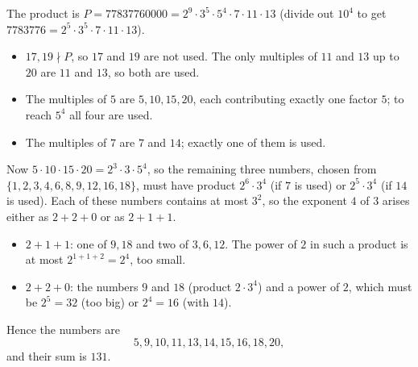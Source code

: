 The product is $P=77837760000=2^9\cdot3^5\cdot5^4\cdot7\cdot11\cdot13$ (divide out $10^4$ to get $7783776=2^5\cdot3^5\cdot7\cdot11\cdot13$).
\begin{itemize}
\item $17,19\nmid P$, so $17$ and $19$ are not used. The only multiples of $11$ and $13$ up to $20$ are $11$ and $13$, so both are used.
\item The multiples of $5$ are $5,10,15,20$, each contributing exactly one factor $5$; to reach $5^4$ all four are used.
\item The multiples of $7$ are $7$ and $14$; exactly one of them is used.
\end{itemize}
Now $5\cdot10\cdot15\cdot20=2^3\cdot3\cdot5^4$, so the remaining three numbers, chosen from $\{1,2,3,4,6,8,9,12,16,18\}$, must have product $2^6\cdot3^4$ (if $7$ is used) or $2^5\cdot3^4$ (if $14$ is used). Each of these numbers contains at most $3^2$, so the exponent $4$ of $3$ arises either as $2+2+0$ or as $2+1+1$.
\begin{itemize}
\item $2+1+1$: one of $9,18$ and two of $3,6,12$. The power of $2$ in such a product is at most $2^{1+1+2}=2^4$, too small.
\item $2+2+0$: the numbers $9$ and $18$ (product $2\cdot3^4$) and a power of $2$, which must be $2^5=32$ (too big) or $2^4=16$ (with $14$).
\end{itemize}
Hence the numbers are
\[
5,9,10,11,13,14,15,16,18,20 ,
\]
and their sum is $\boxed{131}$.
